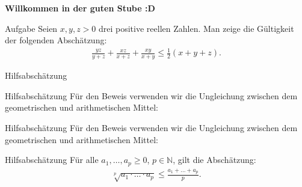 \documentclass[10pt]{beamer}
\title{}
\author{Artur's \( \oint \) Mathematikstübchen}
\date{}
\def\bN{\mathbb{N}}
\begin{document}

\begin{frame}
    \begin{center}
        \textbf{\huge Willkommen in der guten Stube \newline \newline :D}
    \end{center}
\end{frame}




\begin{frame}
    \begin{alertblock}{Aufgabe}
        Seien \( x, y, z > 0 \) drei positive reellen Zahlen. Man zeige die Gültigkeit der folgenden Abschätzung:
        \begin{align*}
            \frac{yz}{y + z} + \frac{xz}{x + z} + \frac{xy}{x + y}
            \leq \frac{1}{2} \left( x + y + z \right).
        \end{align*}
    \end{alertblock}
\end{frame}



\begin{frame}{Hilfsabschätzung}
    
\end{frame}



\begin{frame}{Hilfsabschätzung}
    Für den Beweis verwenden wir die Ungleichung zwischen dem geometrischen und arithmetischen Mittel:
\end{frame}



\begin{frame}{Hilfsabschätzung}
    Für den Beweis verwenden wir die Ungleichung zwischen dem geometrischen und arithmetischen Mittel:
    \begin{block}{Hilfsabschätzung}
        Für alle \( a_{1}, \ldots, a_{p} \geq 0 \), \( p \in \bN \), gilt die Abschätzung:
        \begin{align*}
            \sqrt[p]{a_{1} \cdot \ldots \cdot a_{p}} 
            \leq \frac{a_{1} + \ldots + a_{p}}{p}.
        \end{align*}
    \end{block}
\end{frame}
\end{document}
